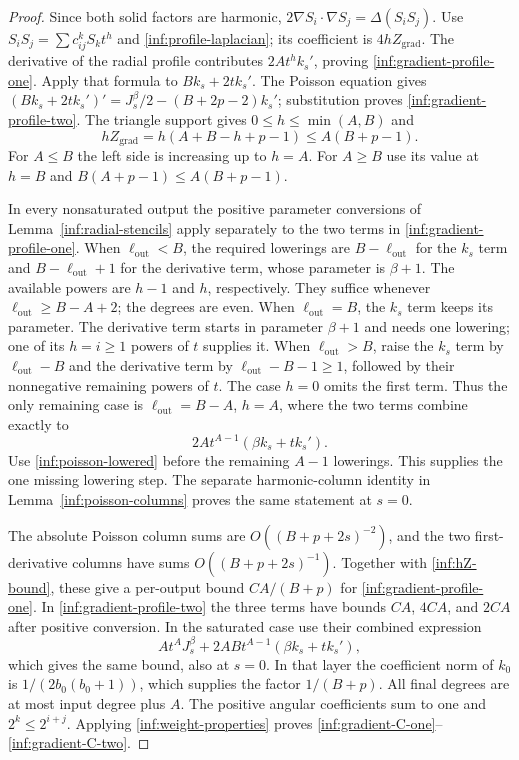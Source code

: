 \begin{proof}
Since both solid factors are harmonic,
$2\nabla S_i\cdot\nabla S_j=\Delta(S_iS_j)$.
Use $S_iS_j=\sum c_{ij}^kS_kt^h$ and
\eqref{inf:profile-laplacian}; its coefficient is $4hZ_{\mathrm{grad}}$.
The derivative of the radial profile contributes $2At^hk_s'$,
proving \eqref{inf:gradient-profile-one}.
Apply that formula to $Bk_s+2tk_s'$.
The Poisson equation gives
$(Bk_s+2tk_s')'=J_s^\beta/2-(B+2p-2)k_s'$;
substitution proves \eqref{inf:gradient-profile-two}.
The triangle support gives $0\le h\le\min(A,B)$ and
\begin{equation}\label{inf:hZ-bound}
 hZ_{\mathrm{grad}}=h(A+B-h+p-1)\le A(B+p-1).
\end{equation}
For $A\le B$ the left side is increasing up to $h=A$.
For $A\ge B$ use its value at $h=B$ and
$B(A+p-1)\le A(B+p-1)$.

In every nonsaturated output the positive parameter conversions of
Lemma~\ref{inf:radial-stencils} apply separately to the two terms
in \eqref{inf:gradient-profile-one}.
When $\ell_{\mathrm{out}}<B$, the required lowerings are $B-\ell_{\mathrm{out}}$ for the $k_s$ term
and $B-\ell_{\mathrm{out}}+1$ for the derivative term, whose parameter is $\beta+1$.
The available powers are $h-1$ and $h$, respectively.
They suffice whenever $\ell_{\mathrm{out}}\ge B-A+2$; the degrees are even.
When $\ell_{\mathrm{out}}=B$, the $k_s$ term keeps its parameter.
The derivative term starts in parameter $\beta+1$ and needs one
lowering; one of its $h=i\ge1$ powers of $t$ supplies it.
When $\ell_{\mathrm{out}}>B$, raise the $k_s$ term by
$\ell_{\mathrm{out}}-B$ and the derivative term by
$\ell_{\mathrm{out}}-B-1\ge1$, followed by their nonnegative
remaining powers of $t$. The case $h=0$ omits the first term.
Thus the only remaining case is $\ell_{\mathrm{out}}=B-A$, $h=A$, where the two
terms combine exactly to
\[
 2At^{A-1}(\beta k_s+tk_s').
\]
Use \eqref{inf:poisson-lowered} before the remaining $A-1$
lowerings. This supplies the one missing lowering step.
The separate harmonic-column identity in Lemma~\ref{inf:poisson-columns}
proves the same statement at $s=0$.

The absolute Poisson column sums are $O((B+p+2s)^{-2})$, and
the two first-derivative columns have sums $O((B+p+2s)^{-1})$.
Together with \eqref{inf:hZ-bound}, these give a per-output bound
$CA/(B+p)$ for \eqref{inf:gradient-profile-one}.
In \eqref{inf:gradient-profile-two} the three terms have bounds
$CA$, $4CA$, and $2CA$ after positive conversion.
In the saturated case use their combined expression
\[
 At^AJ_s^\beta+2ABt^{A-1}(\beta k_s+tk_s'),
\]
which gives the same bound, also at $s=0$.
In that layer the coefficient norm of $k_0$ is
$1/(2b_0(b_0+1))$, which supplies the factor $1/(B+p)$.
All final degrees are at most input degree plus $A$.
The positive angular coefficients sum to one and
$2^k\le2^{i+j}$. Applying \eqref{inf:weight-properties} proves
\eqref{inf:gradient-C-one}--\eqref{inf:gradient-C-two}.
\end{proof}

